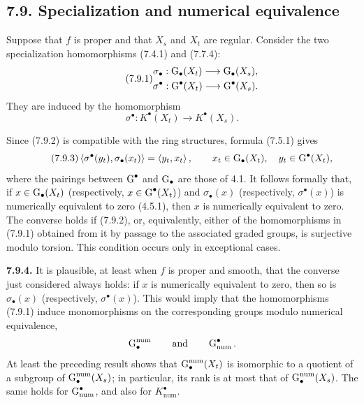 \subsection*{7.9. Specialization and numerical equivalence}
Suppose that $f$ is proper and that $X_s$ and $X_t$ are regular. Consider
the two specialization homomorphisms (7.4.1) and (7.7.4):
\begin{equation}\tag{7.9.1}
\begin{gathered}
\sigma_\bullet:\operatorname{G}_\bullet(X_t)\longrightarrow\operatorname{G}_\bullet(X_s),\\
\sigma^\bullet:\operatorname{G}^\bullet(X_t)\longrightarrow\operatorname{G}^\bullet(X_s).
\end{gathered}
\end{equation}
They are induced by the homomorphism
\begin{equation}\tag{7.9.2}
\sigma^\bullet:K^\bullet(X_t)\longrightarrow K^\bullet(X_s).
\end{equation}

Since (7.9.2) is compatible with the ring structures, formula (7.5.1)
gives
\begin{equation}\tag{7.9.3}
\left\langle\sigma^\bullet(y_t),\sigma_\bullet(x_t)\right\rangle
=\left\langle y_t,x_t\right\rangle,
\qquad
x_t\in\operatorname{G}_\bullet(X_t),\quad y_t\in\operatorname{G}^\bullet(X_t),
\end{equation}
where the pairings between $\operatorname{G}^\bullet$ and $\operatorname{G}_\bullet$ are those of
4.1. It follows formally that, if $x\in\operatorname{G}_\bullet(X_t)$ (respectively,
$x\in\operatorname{G}^\bullet(X_t)$) and $\sigma_\bullet(x)$ (respectively,
$\sigma^\bullet(x)$) is numerically equivalent to zero (4.5.1), then $x$
is numerically equivalent to zero. The converse holds if (7.9.2), or,
equivalently, either of the homomorphisms in (7.9.1) obtained from it by passage to
the associated graded groups, is surjective modulo torsion. This condition
occurs only in exceptional cases.

\textbf{7.9.4.}
It is plausible, at least when $f$ is proper and smooth, that the converse
just considered always holds: if $x$ is numerically equivalent to zero,
then so is $\sigma_\bullet(x)$ (respectively, $\sigma^\bullet(x)$). This
would imply that the homomorphisms (7.9.1) induce monomorphisms on the
corresponding groups modulo numerical equivalence,
\[
\operatorname{G}_\bullet^{\mathrm{num}}
\qquad\text{and}\qquad
\operatorname{G}_{\mathrm{num}}^\bullet.
\]
At least the preceding result shows that
$\operatorname{G}_\bullet^{\mathrm{num}}(X_t)$ is isomorphic to a quotient of a subgroup
of $\operatorname{G}_\bullet^{\mathrm{num}}(X_s)$; in particular, its rank is at most
that of $\operatorname{G}_\bullet^{\mathrm{num}}(X_s)$. The same holds for
$\operatorname{G}_{\mathrm{num}}^\bullet$, and also for $K_{\mathrm{num}}^\bullet$.

